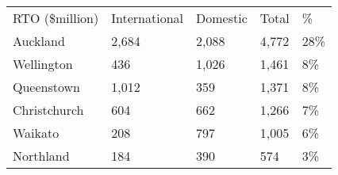 \begin{tabular}[t]{p{2cm}>{\hfill}p{1.5cm}>{\hfill}p{1cm}>{\hfill}p{0.9cm}>{\hfill}p{1.3cm}}
 RTO (\$million) & International & Domestic & Total & \% \\ 
 Auckland & 2,684 & 2,088 & 4,772 & 28\% \\ 
  Wellington &   436 & 1,026 & 1,461 & 8\% \\ 
  Queenstown & 1,012 &   359 & 1,371 & 8\% \\ 
  Christchurch &   604 &   662 & 1,266 & 7\% \\ 
  Waikato &   208 &   797 & 1,005 & 6\% \\ 
  Northland &   184 &   390 &   574 & 3\% \\ 
  \end{tabular}
